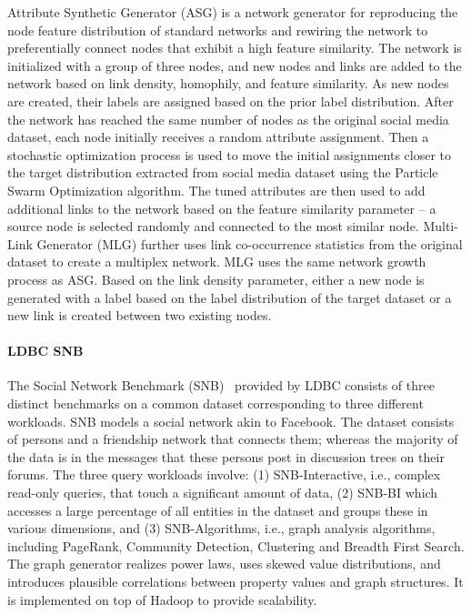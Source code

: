 Attribute Synthetic Generator (ASG) is a network generator for reproducing the
node feature distribution of standard networks and rewiring the network to
preferentially connect nodes that exhibit a high feature similarity. The network
is initialized with a group of three nodes, and new nodes and links are added to
the network based on link density, homophily, and feature similarity. As new
nodes are created, their labels are assigned based on the prior label
distribution. After the network has reached the same number of nodes as the
original social media dataset, each node initially receives a random attribute
assignment. Then a stochastic optimization process is used to move the initial
assignments closer to the target distribution extracted from social media
dataset using the Particle Swarm Optimization algorithm. The tuned attributes
are then used to add additional links to the network based on the feature
similarity parameter -- a source node is selected randomly and connected to the
most similar node. Multi-Link Generator (MLG) further  uses link co-occurrence statistics from the
original dataset to create a multiplex network. MLG uses the same network growth
process as ASG. Based on the link density parameter, either a new node is
generated with a label based on the label distribution of the target dataset or
a new link is created between two existing nodes.


\paragraph{LDBC SNB} The Social Network Benchmark
(SNB)~\cite{Erling:2015:LSN:2723372.2742786} provided by LDBC consists of three
distinct benchmarks on a common dataset corresponding to three different
workloads. SNB models a social network akin to Facebook. The dataset consists of
persons and a friendship network that connects them; whereas the majority of the
data is in the messages that these persons post in discussion trees on their
forums. The three query workloads involve: (1) SNB-Interactive, i.e., complex
read-only queries, that touch a significant amount of data, (2) SNB-BI which
accesses a large percentage of all entities in the dataset and groups these in
various dimensions, and (3) SNB-Algorithms, i.e., graph analysis algorithms,
including PageRank, Community Detection, Clustering and Breadth First Search.
The graph generator realizes power laws, uses skewed value distributions, and
introduces plausible correlations between property values and graph structures.
It is implemented on top of Hadoop to provide scalability.

